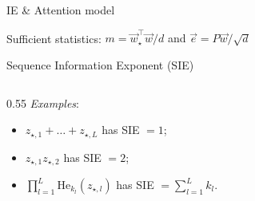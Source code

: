 \documentclass[aspectratio=169,11pt]{beamer}
\begin{document}
\begin{frame}{IE \& Attention model}
  \begin{center}
    {\large Sufficient statistics:}\quad
    {\large $m = \vec{w}_\star^\top\vec{w}/d$
      \quad and \quad $\vec{e} = P\vec{w}/\sqrt{d}$}
  \end{center}
  \pause
  \begin{defbox}[top=2pt, bottom=0pt]{Sequence Information Exponent (SIE)}
  \end{defbox}
  \vspace{0.1em}
  \begin{columns}[T]
    \begin{column}{0.55\textwidth}
      \emph{Examples}:
      \begin{itemize}
        \footnotesize
        \setlength{\itemsep}{0em}
        \setlength{\parskip}{0em}
        \item $z_{\star,1} + \dots + z_{\star,L}$ has SIE $= 1$;
        \item $z_{\star,1}z_{\star,2}$ has SIE $= 2$;
        \item $\prod_{l=1}^L \mathrm{He}_{k_l}(z_{\star,l})$
          has SIE $= \sum_{l=1}^L k_l$.
      \end{itemize}
    \end{column}

\end{columns}
\end{frame}
\end{document}
